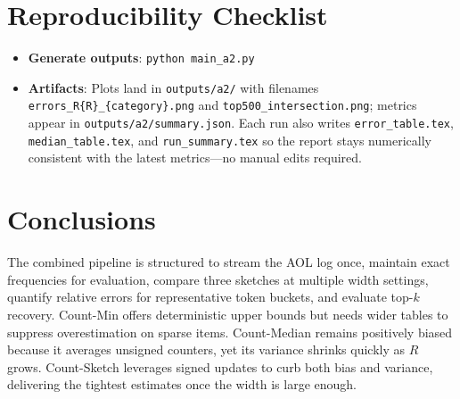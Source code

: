 \documentclass[11pt]{article}
\begin{document}
\section{Reproducibility Checklist}
\begin{itemize}
  \item \textbf{Generate outputs}: \verb|python main_a2.py|\ 
  \item \textbf{Artifacts}: Plots land in \texttt{outputs/a2/} with filenames \texttt{errors\_R\{R\}\_\{category\}.png} and \texttt{top500\_intersection.png}; metrics appear in \texttt{outputs/a2/summary.json}. Each run also writes \texttt{error\_table.tex}, \texttt{median\_table.tex}, and \texttt{run\_summary.tex} so the report stays numerically consistent with the latest metrics—no manual edits required.
\end{itemize}

\section{Conclusions}
The combined pipeline is structured to stream the AOL log once, maintain exact frequencies for evaluation, compare three sketches at multiple width settings, quantify relative errors for representative token buckets, and evaluate top-$k$ recovery. Count-Min offers deterministic upper bounds but needs wider tables to suppress overestimation on sparse items. Count-Median remains positively biased because it averages unsigned counters, yet its variance shrinks quickly as $R$ grows. Count-Sketch leverages signed updates to curb both bias and variance, delivering the tightest estimates once the width is large enough.
\end{document}
